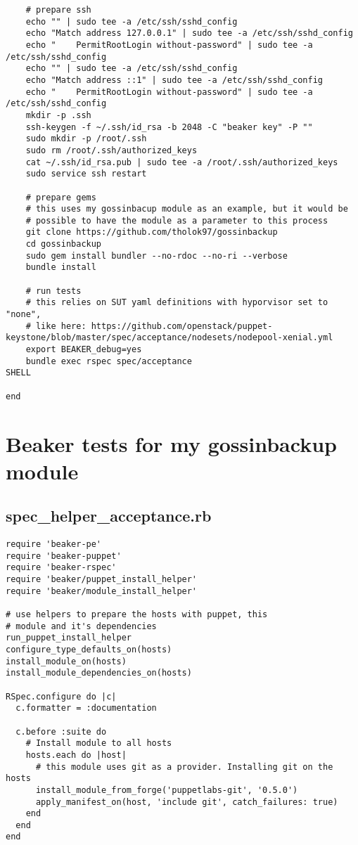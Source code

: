 \begin{verbatim}
    # prepare ssh
    echo "" | sudo tee -a /etc/ssh/sshd_config
    echo "Match address 127.0.0.1" | sudo tee -a /etc/ssh/sshd_config
    echo "    PermitRootLogin without-password" | sudo tee -a /etc/ssh/sshd_config
    echo "" | sudo tee -a /etc/ssh/sshd_config
    echo "Match address ::1" | sudo tee -a /etc/ssh/sshd_config
    echo "    PermitRootLogin without-password" | sudo tee -a /etc/ssh/sshd_config
    mkdir -p .ssh
    ssh-keygen -f ~/.ssh/id_rsa -b 2048 -C "beaker key" -P ""
    sudo mkdir -p /root/.ssh
    sudo rm /root/.ssh/authorized_keys
    cat ~/.ssh/id_rsa.pub | sudo tee -a /root/.ssh/authorized_keys
    sudo service ssh restart
   
    # prepare gems
    # this uses my gossinbacup module as an example, but it would be
    # possible to have the module as a parameter to this process
    git clone https://github.com/tholok97/gossinbackup
    cd gossinbackup
    sudo gem install bundler --no-rdoc --no-ri --verbose
    bundle install

    # run tests
    # this relies on SUT yaml definitions with hyporvisor set to "none",
    # like here: https://github.com/openstack/puppet-keystone/blob/master/spec/acceptance/nodesets/nodepool-xenial.yml
    export BEAKER_debug=yes
    bundle exec rspec spec/acceptance
SHELL

end
\end{verbatim}

\section{Beaker tests for my gossinbackup module} \label{gossinbackuptests}

\subsection{spec\_helper\_acceptance.rb}

\begin{verbatim}
require 'beaker-pe'
require 'beaker-puppet'
require 'beaker-rspec'
require 'beaker/puppet_install_helper'
require 'beaker/module_install_helper'

# use helpers to prepare the hosts with puppet, this
# module and it's dependencies
run_puppet_install_helper
configure_type_defaults_on(hosts)
install_module_on(hosts)
install_module_dependencies_on(hosts)

RSpec.configure do |c|
  c.formatter = :documentation

  c.before :suite do
    # Install module to all hosts
    hosts.each do |host|
      # this module uses git as a provider. Installing git on the hosts
      install_module_from_forge('puppetlabs-git', '0.5.0')
      apply_manifest_on(host, 'include git', catch_failures: true)
    end
  end
end
\end{verbatim}

